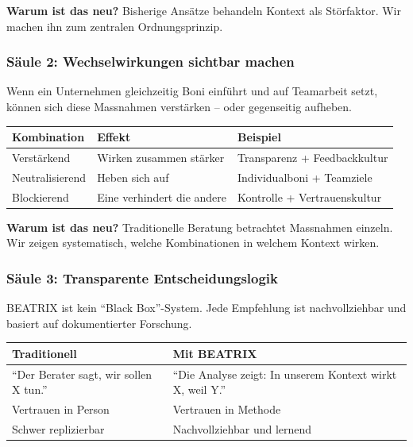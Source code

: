 \documentclass[11pt,a4paper]{article}
\begin{document}
\textbf{Warum ist das neu?} Bisherige Ansätze behandeln Kontext als Störfaktor. Wir machen ihn zum zentralen Ordnungsprinzip.

\subsubsection{Säule 2: Wechselwirkungen sichtbar machen}

Wenn ein Unternehmen gleichzeitig Boni einführt und auf Teamarbeit setzt, können sich diese Massnahmen verstärken -- oder gegenseitig aufheben.

\begin{table}[h]
\centering
\begin{tabularx}{\textwidth}{llX}
\toprule
\textbf{Kombination} & \textbf{Effekt} & \textbf{Beispiel} \\
\midrule
Verstärkend & Wirken zusammen stärker & Transparenz + Feedbackkultur \\
Neutralisierend & Heben sich auf & Individualboni + Teamziele \\
Blockierend & Eine verhindert die andere & Kontrolle + Vertrauenskultur \\
\bottomrule
\end{tabularx}
\end{table}

\textbf{Warum ist das neu?} Traditionelle Beratung betrachtet Massnahmen einzeln. Wir zeigen systematisch, welche Kombinationen in welchem Kontext wirken.

\subsubsection{Säule 3: Transparente Entscheidungslogik}

BEATRIX ist kein ``Black Box''-System. Jede Empfehlung ist nachvollziehbar und basiert auf dokumentierter Forschung.

\begin{table}[h]
\centering
\begin{tabular}{ll}
\toprule
\textbf{Traditionell} & \textbf{Mit BEATRIX} \\
\midrule
``Der Berater sagt, wir sollen X tun.'' & ``Die Analyse zeigt: In unserem Kontext wirkt X, weil Y.'' \\
Vertrauen in Person & Vertrauen in Methode \\
Schwer replizierbar & Nachvollziehbar und lernend \\
\bottomrule
\end{tabular}
\end{table}
\end{document}

